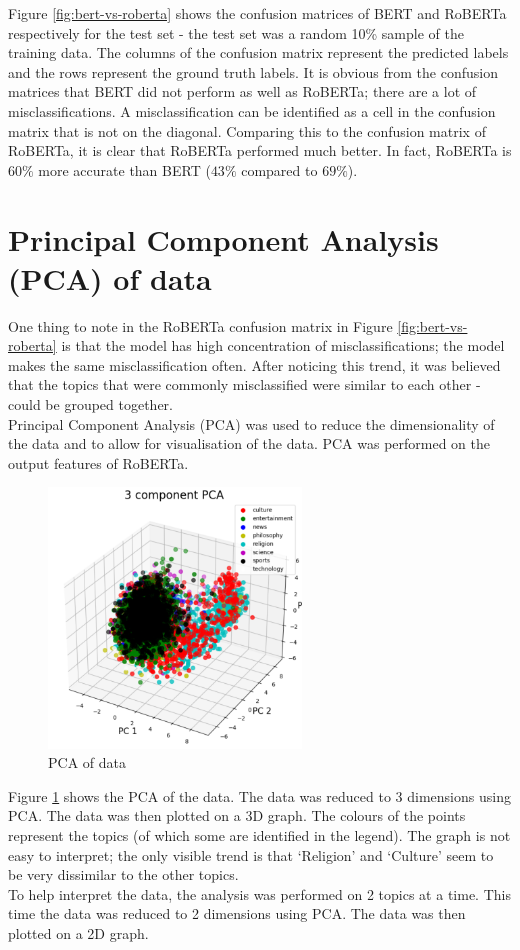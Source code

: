 Figure \ref{fig:bert-vs-roberta} shows the confusion matrices of BERT and RoBERTa respectively for the test set - the test set was a
random 10\% sample of the training data. The columns of the confusion matrix represent the predicted labels and the rows represent the
ground truth labels. It is obvious from the confusion matrices that BERT did not perform as well as RoBERTa; there are a lot of
misclassifications. A misclassification can be identified as a cell in the confusion matrix that is not on the diagonal. Comparing this
to the confusion matrix of RoBERTa, it is clear that RoBERTa performed much better. In fact, RoBERTa is $60\%$ more accurate than BERT
($43\%$ compared to $69\%$).
\section{Principal Component Analysis (PCA) of data}
One thing to note in the RoBERTa confusion matrix in Figure \ref{fig:bert-vs-roberta} is that the model has high concentration
of misclassifications; the model makes the same misclassification often. After noticing this trend, it was believed that the topics
that were commonly misclassified were similar to each other - could be grouped together.\\
Principal Component Analysis (PCA) was used to reduce the dimensionality of the data and to allow for visualisation of the data. PCA
was performed on the output features of RoBERTa.
\begin{figure}
    \centering
    \includegraphics[width=0.6\textwidth]{../images/pca.png}
    \caption{PCA of data}
    \label{fig:pca}
\end{figure}

Figure \ref{fig:pca} shows the PCA of the data. The data was reduced to 3 dimensions using PCA. The data was then plotted on a 3D
graph. The colours of the points represent the topics (of which some are identified in the legend). The graph is not easy to interpret;
the only visible trend is that `Religion' and `Culture' seem to be very dissimilar to the other topics.\\
To help interpret the data, the analysis was performed on 2 topics at a time. This time the data was reduced to 2 dimensions using
PCA. The data was then plotted on a 2D graph.
